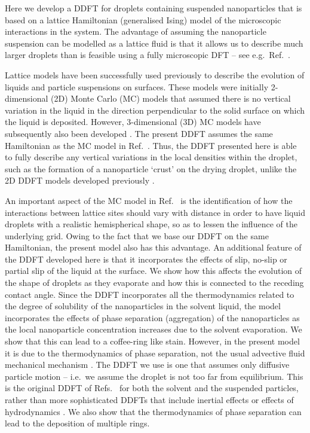 \documentclass[journal=langd5,manuscript=article]{achemso}
\begin{document}
Here we develop a DDFT for droplets containing suspended nanoparticles that is based on a lattice Hamiltonian (generalised Ising) model of the microscopic interactions in the system. The advantage of assuming the nanoparticle suspension can be modelled as a lattice fluid is that it allows us to describe much larger droplets than is feasible using a fully microscopic DFT -- see e.g.\ Ref.~.

Lattice models have been successfully used previously to describe the evolution of liquids and particle suspensions on surfaces. These models were initially 2-dimensional (2D) Monte Carlo (MC) models \cite{blunt2010patterns, rabani2003, pauliac2008, vancea08, stannard2011dewetting, vancea2011pattern} that assumed there is no vertical variation in the liquid in the direction perpendicular to the solid surface on which the liquid is deposited. However, 3-dimensional (3D) MC models have subsequently also been developed \cite{sztrum2005, kim2011, jung2014, crivoi2014, tewes2017comparing, chalmers2017}. The present DDFT assumes the same Hamiltonian as the MC model in Ref.~. Thus, the DDFT presented here is able to fully describe any vertical variations in the local densities within the droplet, such as the formation of a nanoparticle `crust' on the drying droplet, unlike the 2D DDFT models developed previously \cite{archer2010dynamical, robbins2011}.

An important aspect of the MC model in Ref.~ is the identification of how the interactions between lattice sites should vary with distance in order to have liquid droplets with a realistic hemispherical shape, so as to lessen the influence of the underlying grid. Owing to the fact that we base our DDFT on the same Hamiltonian, the present model also has this advantage. An additional feature of the DDFT developed here is that it incorporates the effects of slip, no-slip or partial slip of the liquid at the surface. We show how this affects the evolution of the shape of droplets as they evaporate and how this is connected to the receding contact angle. Since the DDFT incorporates all the thermodynamics related to the degree of solubility of the nanoparticles in the solvent liquid, the model incorporates the effects of phase separation (aggregation) of the nanoparticles as the local nanoparticle concentration increases due to the solvent evaporation. We show that this can lead to a coffee-ring like stain. However, in the present model it is due to the thermodynamics of phase separation, not the usual advective fluid mechanical mechanism \cite{routh2013drying, thiele2014patterned, deegan1997, larson2014}. The DDFT we use is one that assumes only diffusive particle motion -- i.e.\ we assume the droplet is not too far from equilibrium. This is the original DDFT of Refs.\  for both the solvent and the suspended particles, rather than more sophisticated DDFTs that include inertial effects \cite{archer06, archer09} or effects of hydrodynamics \cite{rex2009dynamical, goddard2012unification, goddard2012general}. We also show that the thermodynamics of phase separation can lead to the deposition of multiple rings.
\end{document}
